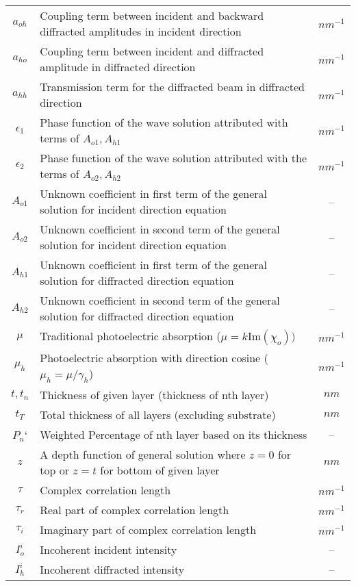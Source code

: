 \begin{table}
\begin{longtable}{|c|l|c|}
$a_{oh}$        & Coupling term between incident and backward diffracted amplitudes in incident direction &$ nm^{-1}$\\
$a_{ho}$        & Coupling term between incident and diffracted amplitude in diffracted direction & $ nm^{-1}$\\
$a_{hh}$        & Transmission term for the diffracted beam in diffracted direction & $ nm^{-1}$\\
$\epsilon_1$	& Phase function of the wave solution attributed with terms of $A_{o1},A_{h1}$ & $ nm^{-1}$\\
$\epsilon_2$	& Phase function of the wave solution attributed with the terms of $A_{o2},A_{h2}$ &$ nm^{-1}$\\
$A_{o1}$				& Unknown coefficient in first term of the general solution for incident direction equation & --\\
$A_{o2}$				& Unknown coefficient in second term of the general solution for incident direction equation & --\\
$A_{h1}$				&Unknown coefficient in first term of the general solution for diffracted direction equation &--\\
$A_{h2}$				&Unknown coefficient in second term of the general solution for diffracted direction equation &--\\		
$\mu$          & Traditional photoelectric absorption ($\mu=k \text{Im}(\chi_o))$  &$ nm^{-1}$\\
$\mu_h$         & Photoelectric absorption with direction cosine ($\mu_h=\mu /\gamma_h$)  &$ nm^{-1}$\\
$t,t_n$           & Thickness of given layer (thickness of nth layer) & $nm$ \\
$t_T$					& Total thickness of all layers (excluding substrate) & $nm$ \\
$P_n$`				& Weighted Percentage of nth layer based on its thickness & --\\
$z$						& A depth function of general solution where $z=0$ for top or $z=t$ for bottom of given layer & $nm$ \\
$\tau$         & Complex correlation length  &$ nm^{-1}$\\
$\tau_r$        & Real part of complex correlation length  &$ nm^{-1}$\\
$\tau_i$         & Imaginary part of complex correlation length  &$ nm^{-1}$\\
$I^i_o$         & Incoherent incident intensity &--\\
$I^i_h$         & Incoherent diffracted intensity &--\\

\end{longtable}
\end{table}

